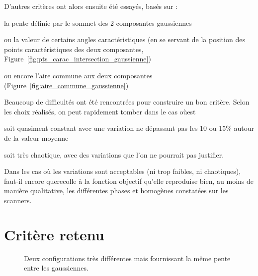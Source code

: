 \documentclass[main.tex]{subfiles}
\begin{document}
D'autres critères ont alors ensuite été essayés, basés sur :
\begin{myitemize}
\item la pente définie par le sommet des 2 composantes gaussiennes
\item ou la valeur de certains angles caractéristiques (en se servant de la position des points caractéristiques des deux composantes, \cf Figure~\ref{fig:pts_carac_intersection_gaussienne})
\item ou encore l'aire commune aux deux composantes (\cf Figure~\ref{fig:aire_commune_gaussienne})
\end{myitemize}
Beaucoup de difficultés ont été rencontrées pour construire un bon critère. Selon les choix réalisés, on peut rapidement tomber dans le cas où\HH est 
\begin{myitemize}
\item soit quasiment constant avec une variation ne dépassant pas les 10 ou 15\% autour de la valeur moyenne
\item soit très chaotique, avec des variations que l'on ne pourrait pas justifier.
\end{myitemize}
Dans les cas où les variations sont acceptables (ni trop faibles, ni chaotiques), faut-il encore que\HH recolle à la fonction objectif \ie qu'elle reproduise bien, au moins de manière qualitative, les différentes phases \heterogenes et homogènes constatées sur les scanners. %


\section{Critère retenu}
\begin{figure}[h]
\centering
{}
\caption{\label{fig:pente_gaussienne_identique}Deux configurations très différentes mais fournissant la même pente entre les gaussiennes.}
\end{figure}
%
\end{document}
